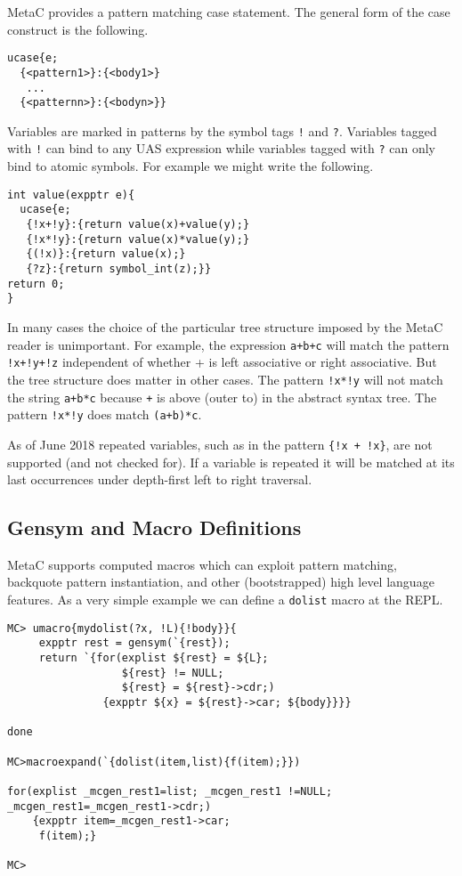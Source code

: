 \documentclass{article}
\begin{document}
MetaC provides a pattern matching case statement.
The general form of the case construct is the following.

\begin{verbatim}
ucase{e;
  {<pattern1>}:{<body1>}
   ...
  {<patternn>}:{<bodyn>}}
\end{verbatim}

Variables are marked in patterns by the symbol tags {\tt !} and {\tt ?}.  Variables tagged with {\tt !} can bind to any UAS expression
while variables tagged with {\tt ?} can only bind to atomic symbols.
For example we might write the following.

\begin{verbatim}
int value(expptr e){
  ucase{e;
   {!x+!y}:{return value(x)+value(y);}
   {!x*!y}:{return value(x)*value(y);}
   {(!x)}:{return value(x);}
   {?z}:{return symbol_int(z);}}
return 0;
}
\end{verbatim}

In many cases the choice of the particular tree structure imposed by the MetaC reader is unimportant.  For example, the expression {\tt a+b+c} will match the pattern
{\tt !x+!y+!z} independent of whether + is left associative or right associative.  But the tree structure does matter in other cases.  The pattern {\tt !x*!y}
will not match the string {\tt a+b*c} because {\tt +} is above (outer to) {\tt *} in the abstract syntax tree. The pattern {\tt !x*!y} does match {\tt (a+b)*c}.

As of June 2018 repeated variables, such as in the pattern {\tt \{!x + !x\}}, are not supported (and not checked for).
If a variable is repeated it will be matched at its last occurrences under depth-first left to right traversal.

\subsection{Gensym and Macro Definitions}

MetaC supports computed macros which can exploit pattern matching, backquote pattern instantiation, and other (bootstrapped) high level language features.
As a very simple example we can define a {\tt dolist} macro at the REPL.

\begin{verbatim}
MC> umacro{mydolist(?x, !L){!body}}{
     expptr rest = gensym(`{rest});
     return `{for(explist ${rest} = ${L};
                  ${rest} != NULL;
                  ${rest} = ${rest}->cdr;)
               {expptr ${x} = ${rest}->car; ${body}}}}

done

MC>macroexpand(`{dolist(item,list){f(item);}})

for(explist _mcgen_rest1=list; _mcgen_rest1 !=NULL; _mcgen_rest1=_mcgen_rest1->cdr;)
    {expptr item=_mcgen_rest1->car;
     f(item);}

MC>
\end{verbatim}
\end{document}
